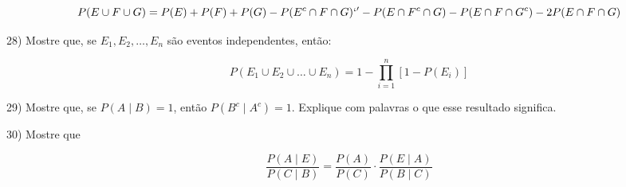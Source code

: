 \documentclass{article}
\begin{document}
\begin{equation*}
P(E \cup F \cup G) = P(E) + P(F) + P(G)
- P(E^c \cap F \cap G)`'
- P(E \cap F^c \cap G)
- P(E \cap F \cap G^c)
- 2P(E \cap F \cap G)
\end{equation*}

\vspace{5px}

28) Mostre que, se \(E_1, E_2, \dots, E_n\) são eventos independentes, então:

\[
P(E_1 \cup E_2 \cup \dots \cup E_n) = 1 - \prod_{i=1}^{n} [1 - P(E_i)]
\]

\vspace{5px}

29) Mostre que, se \(P(A \mid B) = 1\), então \(P(B^c \mid A^c) = 1\). Explique com palavras o que esse resultado significa. 

\vspace{5px}

30) Mostre que

\[
\frac{P(A \mid E)}{P(C \mid B)} = \frac{P(A)}{P(C)} \cdot \frac{P( E \mid A)}{P(B \mid C)}
\]
\end{document}
